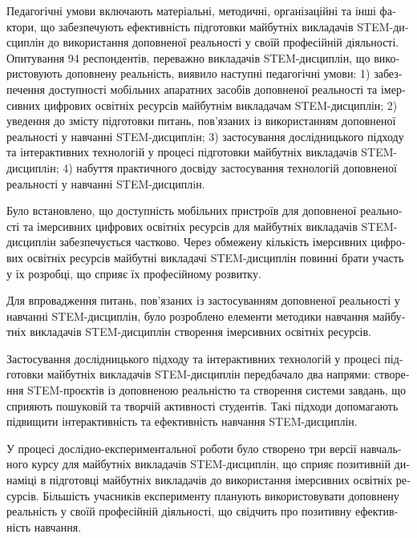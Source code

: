 {\begin{otherlanguage}{ukrainian}
{Педагогічні умови включають матеріальні, методичні, організаційні та інші фактори, що забезпечують ефективність підготовки майбутніх викладачів STEM-дисциплін до використання доповненої реальності у своїй професійній діяльності. Опитування 94 респондентів, переважно викладачів STEM-дисциплін, що використовують доповнену реальність, виявило наступні педагогічні умови:
1)
    забезпечення доступності мобільних апаратних засобів доповненої реальності та імерсивних цифрових освітніх ресурсів майбутнім викладачам STEM-дисциплін;
 2)   уведення до змісту підготовки питань, пов'язаних із використанням доповненої реальності у навчанні STEM-дисциплiн;
    3) застосування дослідницького підходу та інтерактивних технологій у процесі підготовки майбутніх викладачiв STEM-дисциплiн;
    4) набуття практичного досвіду застосування технологій доповненої реальності у навчанні STEM-дисциплiн.

Було встановлено, що доступність мобільних пристроїв для доповненої реальності та імерсивних цифрових освітніх ресурсів для майбутніх викладачів \linebreak STEM-дисциплін забезпечується частково. Через обмежену кількість імерсивних цифрових освітніх ресурсів майбутні викладачі STEM-дисциплін повинні брати участь у їх розробці, що сприяє їх професійному розвитку.

Для впровадження питань, пов'язаних із застосуванням доповненої реальності у навчанні STEM-дисциплін, було розроблено елементи методики навчання майбутніх викладачів STEM-дисциплін створення імерсивних освітніх ресурсів.

Застосування дослідницького підходу та інтерактивних технологій у процесі підготовки майбутніх викладачів STEM-дисциплін передбачало два напрями: створення STEM-проєктів із доповненою реальністю та створення системи завдань, що сприяють пошуковій та творчій активності студентів. Такі підходи допомагають підвищити інтерактивність та ефективність навчання STEM-дисциплін.

У процесі дослідно-експериментальної роботи було створено три версії навчального курсу для майбутніх викладачів STEM-дисциплін, що сприяє позитивній динаміці в підготовці майбутніх викладачів до використання імерсивних освітніх ресурсів. Більшість учасників експерименту планують використовувати доповнену реальність у своїй професійній діяльності, що свідчить про позитивну ефективність навчання.



}
\end{otherlanguage}}

